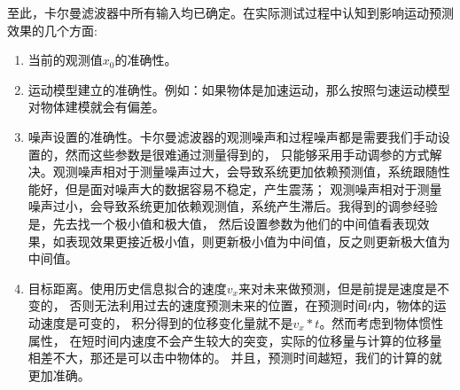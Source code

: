至此，卡尔曼滤波器中所有输入均已确定。在实际测试过程中认知到影响运动预测效果的几个方面:
\begin{enumerate}[itemsep=2pt,topsep=0pt,parsep=0pt]
    \item 当前的观测值$x_0$的准确性。
    \item 运动模型建立的准确性。例如：如果物体是加速运动，那么按照匀速运动模型对物体建模就会有偏差。
    \item 噪声设置的准确性。卡尔曼滤波器的观测噪声和过程噪声都是需要我们手动设置的，然而这些参数是很难通过测量得到的，
    只能够采用手动调参的方式解决。观测噪声相对于测量噪声过大，会导致系统更加依赖预测值，系统跟随性能好，但是面对噪声大的数据容易不稳定，产生震荡；
    观测噪声相对于测量噪声过小，会导致系统更加依赖观测值，系统产生滞后。我得到的调参经验是，先去找一个极小值和极大值，
    然后设置参数为他们的中间值看表现效果，如表现效果更接近极小值，则更新极小值为中间值，反之则更新极大值为中间值。
    \item 目标距离。使用历史信息拟合的速度$v_x$来对未来做预测，但是前提是速度是不变的，
    否则无法利用过去的速度预测未来的位置，在预测时间$t$内，物体的运动速度是可变的，
    积分得到的位移变化量就不是$v_x*t$。然而考虑到物体惯性属性，
    在短时间内速度不会产生较大的突变，实际的位移量与计算的位移量相差不大，那还是可以击中物体的。
    并且，预测时间越短，我们的计算的就更加准确。
\end{enumerate}